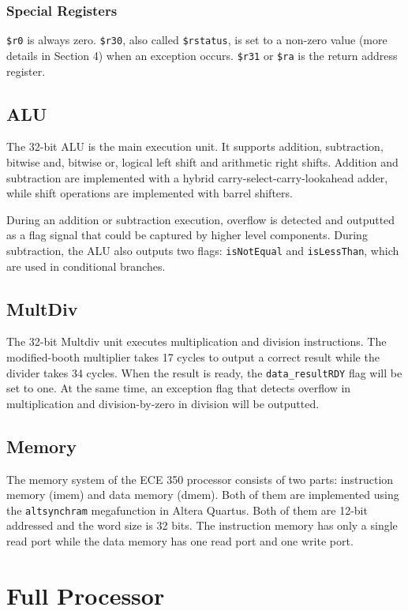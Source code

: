 \documentclass{article}
\begin{document}
\subsubsection{Special Registers}
\texttt{\$r0} is always zero. \texttt{\$r30}, also called \texttt{\$rstatus}, is set to a non-zero value (more details in Section 4) when an exception occurs. \texttt{\$r31} or \texttt{\$ra} is the return address register.

\subsection{ALU}
The 32-bit ALU is the main execution unit. It supports addition, subtraction, bitwise and, bitwise or, logical left shift and arithmetic right shifts. Addition and subtraction are implemented with a hybrid carry-select-carry-lookahead adder, while shift operations are implemented with barrel shifters. \par
During an addition or subtraction execution, overflow is detected and outputted as a flag signal that could be captured by higher level components. During subtraction, the ALU also outputs two flags: \texttt{isNotEqual} and \texttt{isLessThan}, which are used in conditional branches.

\subsection{MultDiv}
The 32-bit Multdiv unit executes multiplication and division instructions. The modified-booth multiplier takes 17 cycles to output a correct result while the divider takes 34 cycles. When the result is ready, the \texttt{data\_resultRDY} flag will be set to one. At the same time, an exception flag that detects overflow in multiplication and division-by-zero in division will be outputted. 

\subsection{Memory}
The memory system of the ECE 350 processor consists of two parts: instruction memory (imem) and data memory (dmem). Both of them are implemented using the \texttt{altsynchram} megafunction in Altera Quartus. Both of them are 12-bit addressed and the word size is 32 bits. The instruction memory has only a single read port while the data memory has one read port and one write port.

\section{Full Processor}
\end{document}
